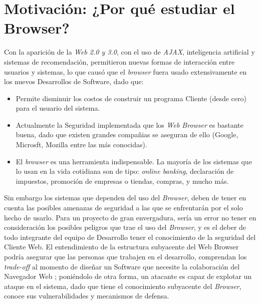\section{Motivación: ¿Por qué estudiar el Browser?}
\label{chap1:motiv}

Con la aparición de la \textit{Web 2.0 y 3.0}, con el uso de \textit{AJAX}, inteligencia artificial y sistemas de recomendación, permitieron nuevas formas de interacción entre usuarios y sistemas, lo que causó que el \textit{browser} fuera usado extensivamente en los nuevos Desarrollos de Software, dado que:
\begin{itemize}
	\item Permite disminuir los costos de construir un programa Cliente (desde cero) para el usuario del sistema.
	\item Actualmente la Seguridad implementada que los \textit{Web Browser} es bastante buena, dado que existen grandes compañias se aseguran de ello (Google, Microsft, Mozilla entre las más conocidas). 
	\item El \textit{browser} es una herramienta indispensable. La mayoría de los sistemas que lo usan en la vida cotidiana son de tipo: \textit{online banking}, declaración de impuestos, promoción de empresas o tiendas, compras, y mucho más.
\end{itemize}

Sin embargo los sistemas que dependen del uso del \textit{Browser}, deben de tener en cuenta las posibles amenazas de seguridad a las que se enfrentarán por el solo hecho de usarlo. Para un proyecto de gran envergadura, sería un error no tener en consideración los posibles peligros que trae el uso del \textit{Browser}, y es el deber de todo integrante del equipo de Desarrollo tener el conocimiento de la seguridad del Cliente Web. El entendimiento de la estructura subyacente del Web Browser podría asegurar que las personas que trabajen en el desarrollo, comprendan los \textit{trade-off} al momento de diseñar un Software que necesite la colaboración del Navegador Web \cite{535061, 2005-grosskurth-browser-refarch,preprint-grosskurth-browser-archevol}; poniéndolo de otra forma, un atacante es capaz de explotar un ataque en el sistema, dado que tiene el conocimiento subyacente del \textit{Browser}, conoce sus vulnerabilidades y mecanismos de defensa.

